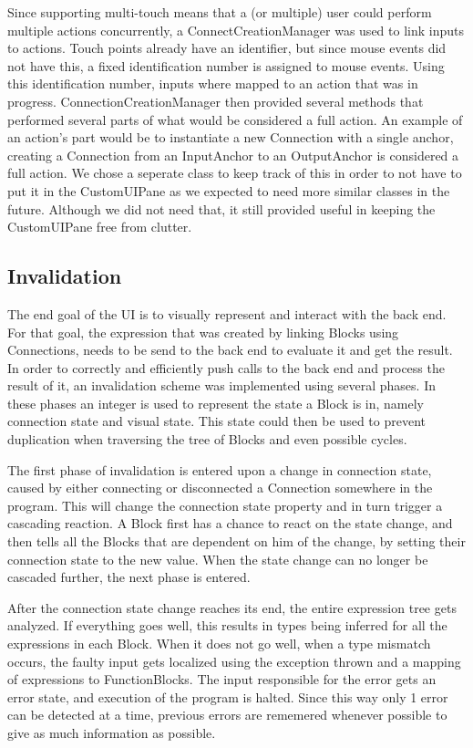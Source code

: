 Since supporting multi-touch means that a (or multiple) user could perform multiple actions concurrently, a ConnectCreationManager was used to link inputs to actions. Touch points already have an identifier, but since mouse events did not have this, a fixed identification number is assigned to mouse events. Using this identification number, inputs where mapped to an action that was in progress. ConnectionCreationManager then provided several methods that performed several parts of what would be considered a full action. An example of an action's part would be to instantiate a new Connection with a single anchor, creating a Connection from an InputAnchor to an OutputAnchor is considered a full action. We chose a seperate class to keep track of this in order to not have to put it in the CustomUIPane as we expected to need more similar classes in the future. Although we did not need that, it still provided useful in keeping the CustomUIPane free from clutter.

\subsection{Invalidation}
The end goal of the UI is to visually represent and interact with the back end. For that goal, the expression that was created by linking Blocks using Connections, needs to be send to the back end to evaluate it and get the result. In order to correctly and efficiently push calls to the back end and process the result of it, an invalidation scheme was implemented using several phases. In these phases an integer is used to represent the state a Block is in, namely connection state and visual state. This state could then be used to prevent duplication when traversing the tree of Blocks and even possible cycles.

The first phase of invalidation is entered upon a change in connection state, caused by either connecting or disconnected a Connection somewhere in the program. This will change the connection state property and in turn trigger a cascading reaction. A Block first has a chance to react on the state change, and then tells all the Blocks that are dependent on him of the change, by setting their connection state to the new value. When the state change can no longer be cascaded further, the next phase is entered.

After the connection state change reaches its end, the entire expression tree gets analyzed. If everything goes well, this results in types being inferred for all the expressions in each Block. When it does not go well, when a type mismatch occurs, the faulty input gets localized using the exception thrown and a mapping of expressions to FunctionBlocks. The input responsible for the error gets an error state, and execution of the program is halted. Since this way only 1 error can be detected at a time, previous errors are rememered whenever possible to give as much information as possible.

